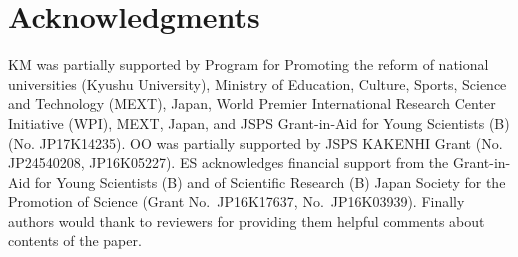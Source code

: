 \documentclass[a4paper,12pt]{article}
\numberwithin{equation}{section}
\begin{document}
\section*{Acknowledgments}
KM was partially supported by Program for Promoting the reform of national universities (Kyushu University), Ministry of Education, Culture, Sports, Science and Technology (MEXT), Japan, World Premier International Research Center Initiative (WPI), MEXT, Japan, and JSPS Grant-in-Aid for Young Scientists (B) (No. JP17K14235).
OO was partially supported by JSPS KAKENHI Grant (No. JP24540208, JP16K05227). 
ES acknowledges financial support from the Grant-in-Aid for Young Scientists (B) and of Scientific Research (B) Japan Society for the Promotion of Science (Grant No.~JP16K17637, No.~JP16K03939).
Finally authors would thank to reviewers for providing them helpful comments about contents of the paper.
\end{document}

